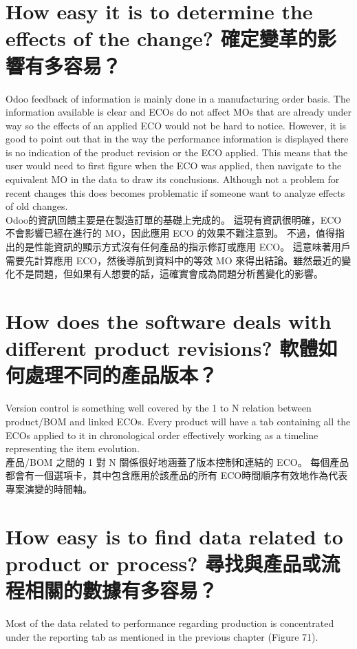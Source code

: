 \section{How easy it is to determine the effects of the change? 確定變革的影響有多容易？}
\fontsize{12pt}{2.5pt}\selectfont 
{Odoo feedback of information is mainly done in a manufacturing order basis. The information available is clear and ECOs do not affect MOs that are already under way so the effects of an applied ECO would not be hard to notice. However, it is good to point out that in the way the performance information is displayed there is no indication of the product revision or the ECO applied. This means that the user would need to first figure when the ECO was applied, then navigate to the equivalent MO in the data to draw its conclusions. Although not a problem for recent changes this does becomes problematic if someone want to analyze effects of old changes.}\\[1pt]

\fontsize{12pt}{2.5pt}\selectfont
{Odoo的資訊回饋主要是在製造訂單的基礎上完成的。 這現有資訊很明確，ECO 不會影響已經在進行的 MO，因此應用 ECO 的效果不難注意到。 不過，值得指出的是性能資訊的顯示方式沒有任何產品的指示修訂或應用 ECO。 這意味著用戶需要先計算應用 ECO，然後導航到資料中的等效 MO 來得出結論。雖然最近的變化不是問題，但如果有人想要的話，這確實會成為問題分析舊變化的影響。}\\[1pt]

\section{How does the software deals with different product revisions? 軟體如何處理不同的產品版本？}
\fontsize{12pt}{2.5pt}\selectfont 
{Version control is something well covered by the 1 to N relation between product/BOM
and linked ECOs. Every product will have a tab containing all the ECOs applied to it in
chronological order effectively working as a timeline representing the item evolution.}\\[1pt]

\fontsize{12pt}{2.5pt}\selectfont
{產品/BOM 之間的 1 對 N 關係很好地涵蓋了版本控制和連結的 ECO。 每個產品都會有一個選項卡，其中包含應用於該產品的所有 ECO時間順序有效地作為代表專案演變的時間軸。}\\[1pt]

\section{How easy is to find data related to product or process? 尋找與產品或流程相關的數據有多容易？}
\fontsize{12pt}{2.5pt}\selectfont 
{Most of the data related to performance regarding production is concentrated under the reporting tab as mentioned in the previous chapter (Figure 71). }\\[1pt]


